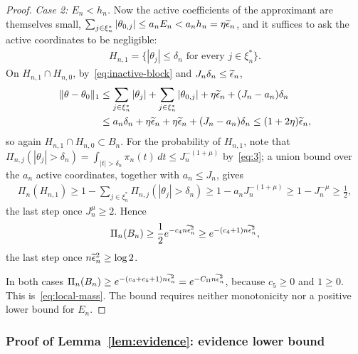 \begin{proof}
\smallskip\noindent\emph{Case 2: $E_n<h_n$.}
Now the active coefficients of the approximant are themselves small, $\sum_{j\in\xi_n^*}|\theta_{0,j}|\leq a_nE_n<a_nh_n=\eta\widetilde{\epsilon}_n$, and it suffices to ask the active coordinates to be negligible:
\begin{align*}
H_{n,1}=\{|\theta_j|\leq\delta_n\text{ for every }j\in\xi_n^*\}.
\end{align*}
On $H_{n,1}\cap H_{n,0}$, by~\eqref{eq:inactive-block} and $J_n\delta_n\leq\widetilde{\epsilon}_n$,
\begin{align*}
\|\theta-\theta_0\|_1
&\leq\sum_{j\in\xi_n^*}|\theta_j|+\sum_{j\in\xi_n^*}|\theta_{0,j}|
  +\eta\widetilde{\epsilon}_n+(J_n-a_n)\delta_n\\
&\leq a_n\delta_n+\eta\widetilde{\epsilon}_n+\eta\widetilde{\epsilon}_n+(J_n-a_n)\delta_n
\leq(1+2\eta)\widetilde{\epsilon}_n,
\end{align*}
so again $H_{n,1}\cap H_{n,0}\subset B_n$. For the probability of $H_{n,1}$, note that $\Pi_{n,j}(|\theta_j|>\delta_n)=\int_{|t|>\delta_n}\pi_n(t)\,dt\leq J_n^{-(1+\mu)}$ by~\eqref{eq:3}; a union bound over the $a_n$ active coordinates, together with $a_n\leq J_n$, gives
\begin{align*}
\Pi_n(H_{n,1})
\geq1-\sum_{j\in\xi_n^*}\Pi_{n,j}(|\theta_j|>\delta_n)
\geq1-a_nJ_n^{-(1+\mu)}
\geq1-J_n^{-\mu}
\geq\frac12,
\end{align*}
the last step once $J_n^\mu\geq2$. Hence
\begin{align*}
\Pi_n(B_n)\geq\frac12e^{-c_4n\widetilde{\epsilon}_n^2}\geq e^{-(c_4+1)n\widetilde{\epsilon}_n^2},
\end{align*}
the last step once $n\widetilde{\epsilon}_n^2\geq\log2$.

In both cases $\Pi_n(B_n)\geq e^{-(c_4+c_5+1)n\widetilde{\epsilon}_n^2}=e^{-C_\Pi n\widetilde{\epsilon}_n^2}$, because $c_5\geq0$ and $1\geq0$. This is~\eqref{eq:local-mass}. The bound requires neither monotonicity nor a positive lower bound for $E_n$.
\end{proof}

\subsubsection*{Proof of Lemma~\ref{lem:evidence}: evidence lower bound}

